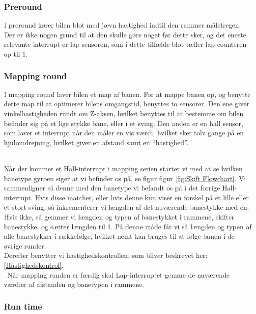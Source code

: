 \subsubsection{Preround}
I preround kører bilen blot med jævn hastighed indtil den rammer målstregen. Der er ikke nogen grund til at den skulle gøre noget før dette sker, og det eneste relevante interrupt er lap sensoren, som i dette tilfælde blot tæller lap counteren op til 1.

\subsubsection{Mapping round}
I mapping round laver bilen et map af banen. For at mappe banen op, og benytte dette map til at optimerer bilens omgangstid, benyttes to sensorer. Den ene giver vinkelhastigheden rundt om Z-aksen, hvilket benyttes til at bestemme om bilen befinder sig på et lige stykke bane, eller i et sving. Den anden er en hall sensor, som laver et interrupt når den måler en vis værdi, hvilket sker tolv gange på en hjulomdrejning, hvilket giver en afstand samt en ``hastighed''.
\\\


Når der kommer et Hall-interrupt i mapping serien starter vi med at se hvilken banetype gyroen siger at vi befinder os på, se figur figur \ref{fig:Skift Flowchart}. Vi sammenligner så denne med den banetype vi befandt os på i det forrige Hall-interrupt. Hvis disse matcher, eller hvis denne kun viser en forskel på et lille eller et stort sving, så inkrementerer vi længden af det nuværende banestykke med én. Hvis ikke, så gemmer vi længden og typen af banestykket i rammene, skifter banestykke, og sætter længden til 1. På denne måde får vi så længden og typen af alle banestykker i rækkefølge, hvilket nemt kan bruges til at følge banen i de øvrige runder.
\\
Derefter benytter vi hastighedskontrollen, som bliver beskrevet her: \ref{Hastighedskontrol}.
\\\
Når mapping runden er færdig skal Lap-interruptet gemme de nuværende værdier af afstanden og banetypen i rammene. 

\subsubsection{Run time}

